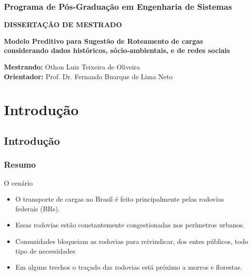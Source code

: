 \documentclass[11pt]{beamer}
\begin{document}
\begin{frame}\frametitle{ \Large Programa de Pós-Graduação em Engenharia de Sistemas}
	\begin{center}
		\Large \textbf{DISSERTAÇÃO DE MESTRADO} 
	\end{center}
	\pause
	\begin{block}
		\Large \textbf{Modelo Preditivo para Sugestão de Roteamento de cargas considerando dados históricos, sócio-ambientais, e de redes sociais}
	\end{block}
	
	\pause
	\vspace{0.3in}
	\textbf{Mestrando:} Othon Luiz Teixeira de Oliveira \\
	\textbf{Orientador:} Prof. Dr. Fernando Buarque de Lima Neto
	
\end{frame}

\AtBeginSection[]{ 
	\begin{frame} 
		\frametitle{Sumário} \tableofcontents[currentsection] 
	\end{frame} 
	} 



\section{ Introdução}
\subsection*{Introdução}

\begin{frame}\frametitle{Resumo}
	
	\begin{block}{O cenário}
		\begin{itemize}
			\item O transporte de cargas no Brasil é feito principalmente pelas rodovias federais (BRs). 
			\pause
			\item Essas rodovias estão constantemente congestionadas nos perímetros urbanos.
			\pause
			\item Comunidades bloqueiam as rodovias para reivindicar, dos entes públicos, todo tipo de necessidades
			\pause
			\item Em alguns trechos o traçado das rodovias está próximo a morros e florestas.
			
		\end{itemize}
	\end{block}
\end{frame}
\end{document}
